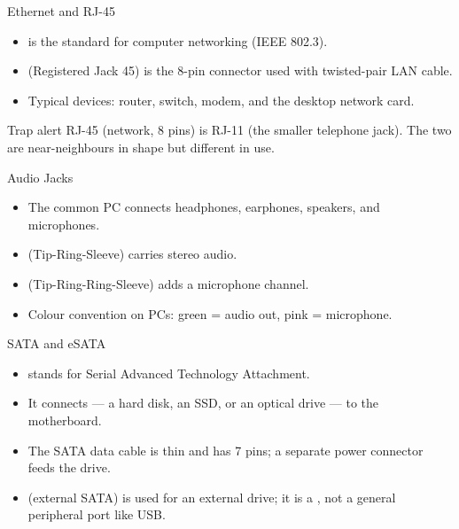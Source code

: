 \documentclass[aspectratio=169]{beamer}
\begin{document}
\begin{frame}{Ethernet and RJ-45}
  \begin{itemize}
    \item {} is the standard for  computer networking
      (IEEE 802.3).
    \item {} (Registered Jack 45) is the 8-pin connector used with
      twisted-pair LAN cable.
    \item Typical devices: router, switch, modem, and the desktop network
      card.
  \end{itemize}
  \begin{alertblock}{Trap alert}
    RJ-45 (network, 8 pins) is  RJ-11 (the smaller telephone jack).
    The two are near-neighbours in shape but different in use.
  \end{alertblock}
\end{frame}

\begin{frame}{Audio Jacks}
  \begin{itemize}
    \item The common PC  connects headphones,
      earphones, speakers, and microphones.
    \item {} (Tip-Ring-Sleeve) carries stereo audio.
    \item {} (Tip-Ring-Ring-Sleeve) adds a microphone channel.
    \item Colour convention on PCs: green = audio out, pink = microphone.
  \end{itemize}
  \vspace{0.25cm}
\end{frame}

\begin{frame}{SATA and eSATA}
  \begin{itemize}
    \item {} stands for Serial Advanced Technology Attachment.
    \item It connects  --- a hard disk, an SSD, or an
      optical drive --- to the motherboard.
    \item The SATA data cable is thin and has 7 pins; a separate power
      connector feeds the drive.
    \item {} (external SATA) is used for an external drive; it is a
      , not a general peripheral port like USB.
  \end{itemize}
\end{frame}
\end{document}
